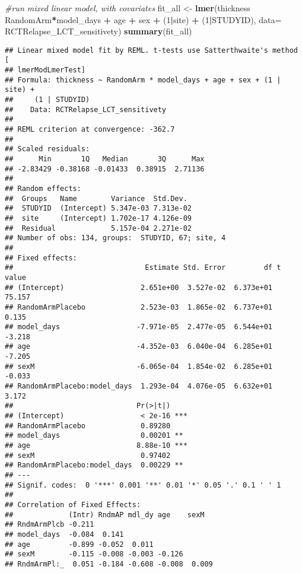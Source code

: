 \documentclass[]{article}
\newenvironment{Shaded}{\begin{snugshade}}{\end{snugshade}}
\newcommand{\KeywordTok}[1]{\textcolor[rgb]{0.13,0.29,0.53}{\textbf{#1}}}
\newcommand{\DataTypeTok}[1]{\textcolor[rgb]{0.13,0.29,0.53}{#1}}
\newcommand{\DecValTok}[1]{\textcolor[rgb]{0.00,0.00,0.81}{#1}}
\newcommand{\StringTok}[1]{\textcolor[rgb]{0.31,0.60,0.02}{#1}}
\newcommand{\CommentTok}[1]{\textcolor[rgb]{0.56,0.35,0.01}{\textit{#1}}}
\newcommand{\OperatorTok}[1]{\textcolor[rgb]{0.81,0.36,0.00}{\textbf{#1}}}
\newcommand{\NormalTok}[1]{#1}
\theoremstyle{definition}
\theoremstyle{definition}
\theoremstyle{definition}
\theoremstyle{remark}
\begin{document}
\begin{Shaded}
\begin{Highlighting}[]
\CommentTok{#run mixed linear model, with covariates}
\NormalTok{  fit_all <-}\StringTok{ }\KeywordTok{lmer}\NormalTok{(thickness }\OperatorTok{~}\StringTok{ }\NormalTok{RandomArm}\OperatorTok{*}\NormalTok{model_days }\OperatorTok{+}\StringTok{ }\NormalTok{age }\OperatorTok{+}\StringTok{ }\NormalTok{sex }\OperatorTok{+}\StringTok{ }\NormalTok{(}\DecValTok{1}\OperatorTok{|}\NormalTok{site) }\OperatorTok{+}\StringTok{ }\NormalTok{(}\DecValTok{1}\OperatorTok{|}\NormalTok{STUDYID), }\DataTypeTok{data=}\NormalTok{ RCTRelapse_LCT_sensitivety)}
  \KeywordTok{summary}\NormalTok{(fit_all)}
\end{Highlighting}
\end{Shaded}

\begin{verbatim}
## Linear mixed model fit by REML. t-tests use Satterthwaite's method [
## lmerModLmerTest]
## Formula: thickness ~ RandomArm * model_days + age + sex + (1 | site) +  
##     (1 | STUDYID)
##    Data: RCTRelapse_LCT_sensitivety
## 
## REML criterion at convergence: -362.7
## 
## Scaled residuals: 
##      Min       1Q   Median       3Q      Max 
## -2.83429 -0.38168 -0.01433  0.38915  2.71136 
## 
## Random effects:
##  Groups   Name        Variance  Std.Dev. 
##  STUDYID  (Intercept) 5.347e-03 7.313e-02
##  site     (Intercept) 1.702e-17 4.126e-09
##  Residual             5.157e-04 2.271e-02
## Number of obs: 134, groups:  STUDYID, 67; site, 4
## 
## Fixed effects:
##                               Estimate Std. Error         df t value
## (Intercept)                  2.651e+00  3.527e-02  6.373e+01  75.157
## RandomArmPlacebo             2.523e-03  1.865e-02  6.737e+01   0.135
## model_days                  -7.971e-05  2.477e-05  6.544e+01  -3.218
## age                         -4.352e-03  6.040e-04  6.285e+01  -7.205
## sexM                        -6.065e-04  1.854e-02  6.285e+01  -0.033
## RandomArmPlacebo:model_days  1.293e-04  4.076e-05  6.632e+01   3.172
##                             Pr(>|t|)    
## (Intercept)                  < 2e-16 ***
## RandomArmPlacebo             0.89280    
## model_days                   0.00201 ** 
## age                         8.88e-10 ***
## sexM                         0.97402    
## RandomArmPlacebo:model_days  0.00229 ** 
## ---
## Signif. codes:  0 '***' 0.001 '**' 0.01 '*' 0.05 '.' 0.1 ' ' 1
## 
## Correlation of Fixed Effects:
##             (Intr) RndmAP mdl_dy age    sexM  
## RndmArmPlcb -0.211                            
## model_days  -0.084  0.141                     
## age         -0.899 -0.052  0.011              
## sexM        -0.115 -0.008 -0.003 -0.126       
## RndmArmPl:_  0.051 -0.184 -0.608 -0.008  0.009
\end{verbatim}
\end{document}
